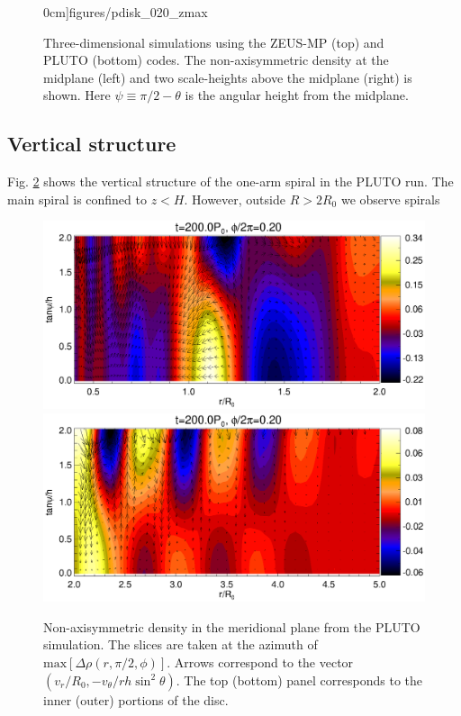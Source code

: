 \begin{figure}
\begin{center}
{      0cm]{figures/pdisk_020_zmax}
    }
  \end{center}
  \caption{Three-dimensional simulations using the ZEUS-MP (top) and 
    PLUTO (bottom) codes. The non-axisymmetric density at the midplane (left) and
    two scale-heights above the midplane (right) is shown. Here $\psi
    \equiv \pi/2 - \theta$ is the angular height  
    from the midplane.\label{3d_prelim}}   
\end{figure}

\subsection{Vertical structure}
Fig. \ref{3d_rz} shows the vertical structure of the one-arm
spiral in the PLUTO run. The main spiral is confined to $z < H$.
However, outside $R>2R_0$ we observe spirals   

\begin{figure}
  \includegraphics[scale=0.47,clip=true,trim=0cm 0.79cm 0cm 0cm]{figures/pdisk_rz_020_sg.ps}
  \includegraphics[scale=0.47,clip=true,trim=0cm 0cm 0cm 0.64cm]{figures/pdisk_rz_020_nsg.ps}
  \caption{Non-axisymmetric density in the meridional plane from the
    PLUTO simulation. The slices are taken at the azimuth of   
    $\mathrm{max}[\Delta\rho(r,\pi/2,\phi)]$. Arrows correspond to the vector 
    $(v_r/R_0,-v_\theta/rh\sin^2{\theta})$. The top (bottom) panel corresponds
    to the inner (outer) portions of the disc. 
    \label{3d_rz}} 
\end{figure}   

